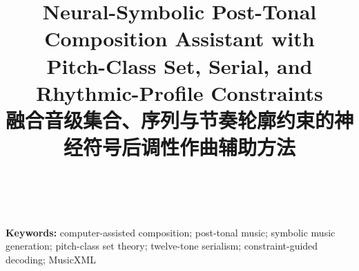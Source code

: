 \documentclass[11pt]{article}
\title{Neural-Symbolic Post-Tonal Composition Assistant with\\
Pitch-Class Set, Serial, and Rhythmic-Profile Constraints\\[0.5em]
\large 融合音级集合、序列与节奏轮廓约束的神经符号后调性作曲辅助方法}
\author{\submissionauthor\\\small \submissionaffiliation}
\date{}
\begin{document}
\maketitle



\noindent\textbf{Keywords:} computer-assisted composition; post-tonal music; symbolic music generation; pitch-class set theory; twelve-tone serialism; constraint-guided decoding; MusicXML

















\end{document}
